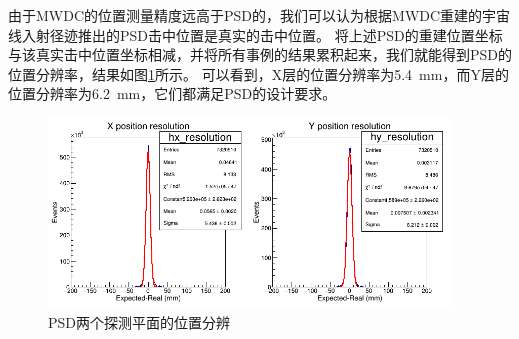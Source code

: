 由于MWDC的位置测量精度远高于PSD的，我们可以认为根据MWDC重建的宇宙线入射径迹推出的PSD击中位置是真实的击中位置。
将上述PSD的重建位置坐标与该真实击中位置坐标相减，并将所有事例的结果累积起来，我们就能得到PSD的位置分辨率，结果如图\ref{fig:cosmic_ray:pos_resolution}所示。
可以看到，X层的位置分辨率为\SI{5.4}{mm}，而Y层的位置分辨率为\SI{6.2}{mm}，它们都满足PSD的设计要求。
\begin{figure}[htbp]
	\centering
	\includegraphics[width=0.95\textwidth]{chap/cosmic_ray/fig/pos_resolution.png}
	\caption{PSD两个探测平面的位置分辨}
	\label{fig:cosmic_ray:pos_resolution}
\end{figure}
